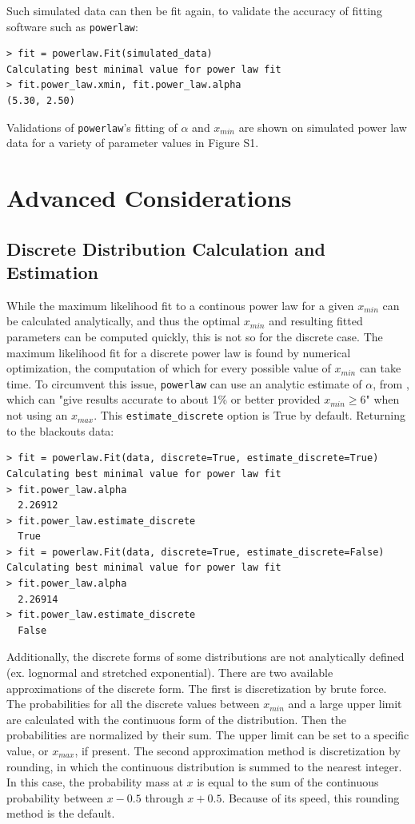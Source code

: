 \documentclass[10pt]{article}
\begin{document}
Such simulated data can then be fit again, to validate the accuracy of fitting software such as \verb$powerlaw$:

\begin{verbatim}
> fit = powerlaw.Fit(simulated_data)
Calculating best minimal value for power law fit
> fit.power_law.xmin, fit.power_law.alpha
(5.30, 2.50)
\end{verbatim}

Validations of \verb$powerlaw$'s fitting of $\alpha$ and $x_{min}$ are shown on simulated power law data for a variety of parameter values in Figure S1.

\section*{Advanced Considerations}

\subsection*{Discrete Distribution Calculation and Estimation}
While the maximum likelihood fit to a continous power law for a given $x_{min}$ can be calculated analytically, and thus the optimal $x_{min}$ and resulting fitted parameters can be computed quickly, this is not so for the discrete case. The maximum likelihood fit for a discrete power law is found by numerical optimization, the computation of which for every possible value of $x_{min}$ can take time. To circumvent this issue, \verb$powerlaw$ can use an analytic estimate of $\alpha$, from \cite{Clauset2009}, which can "give results accurate to about 1\% or better provided $x_{min} \ge 6$" when not using an $x_{max}$.  This \verb"estimate_discrete" option is True by default. Returning to the blackouts data:

\begin{verbatim}
> fit = powerlaw.Fit(data, discrete=True, estimate_discrete=True)
Calculating best minimal value for power law fit
> fit.power_law.alpha
  2.26912
> fit.power_law.estimate_discrete
  True
> fit = powerlaw.Fit(data, discrete=True, estimate_discrete=False)
Calculating best minimal value for power law fit
> fit.power_law.alpha
  2.26914
> fit.power_law.estimate_discrete
  False
\end{verbatim}

Additionally, the discrete forms of some distributions are not analytically defined (ex. lognormal and stretched exponential). There are two available approximations of the discrete form. The first is discretization by brute force. The probabilities for all the discrete values between $x_{min}$ and a large upper limit are calculated with the continuous form of the distribution. Then the probabilities are normalized by their sum. The upper limit can be set to a specific value, or $x_{max}$, if present. The second approximation method is discretization by rounding, in which the continuous distribution is summed to the nearest integer. In this case, the probability mass at $x$ is equal to the sum of the continuous probability between $x-0.5$ through $x+0.5$. Because of its speed, this rounding method is the default.
\end{document}

